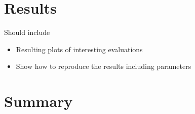 \documentclass[a4paper, oneside]{discothesis}
\begin{document}
\chapter{Results}

Should include
\begin{itemize}
\item Resulting plots of interesting evaluations
\item Show how to reproduce the results including parameters
\end{itemize}

\chapter{Summary}





\end{document}
